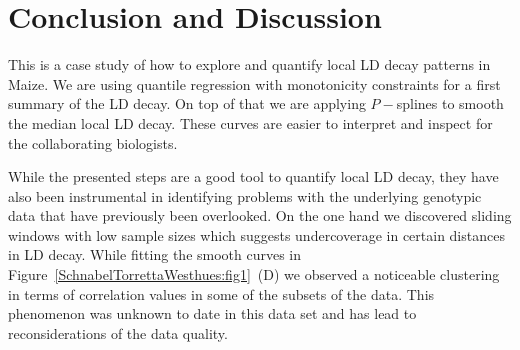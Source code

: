 \documentclass[twoside]{report}
\begin{document}

\section{Conclusion and Discussion}
This is a case study of how to explore and quantify local LD decay patterns in Maize. We are using
quantile regression with monotonicity constraints for a first summary of the LD decay. 
On top of that we are applying $P-$splines to smooth the median local LD decay. These curves 
are easier to interpret and inspect for the collaborating biologists. 

While the presented steps are a good tool to quantify local LD decay, they have also been 
	instrumental in identifying problems with the underlying genotypic data that have previously been 
	overlooked. On the one hand we discovered sliding windows with low sample sizes which suggests 
	undercoverage in certain distances in LD decay. 
	While fitting the smooth curves in Figure~\ref{SchnabelTorrettaWesthues:fig1}~(D) we 
	observed a noticeable clustering 
	in terms of correlation values in some of the subsets of the data. This phenomenon was unknown 
	to date in this data set and has lead to reconsiderations of the data quality. 
	
\end{document}
